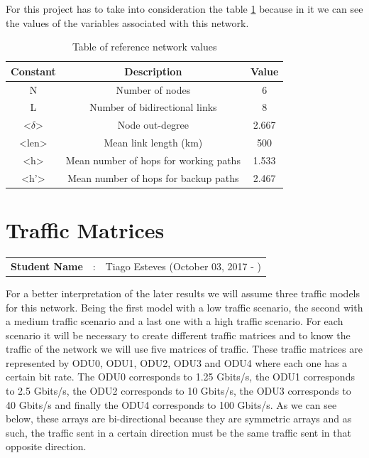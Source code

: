 \newpage
For this project has to take into consideration the table \ref{table_ref_net} because in it we can see the values of the variables associated with this network.\\

\begin{table}[h!]
\centering
\begin{tabular}{|| c | c | c||}
 \hline
 Constant & Description & Value \\
 \hline\hline
 N & Number of nodes & 6 \\
 L & Number of bidirectional links & 8 \\
 <$\delta$> & Node out-degree & 2.667 \\
 <len> & Mean link length (km) & 500 \\
 <h> & Mean number of hops for working paths & 1.533 \\
 <h'> & Mean number of hops for backup paths & 2.467 \\
 \hline
\end{tabular}
\caption{Table of reference network values}
\label{table_ref_net}
\end{table}


\section{Traffic Matrices}\label{Reference_Network_Traffic}
\begin{tcolorbox}	
\begin{tabular}{p{2.75cm} p{0.2cm} p{10.5cm}} 	
\textbf{Student Name}  &:& Tiago Esteves    (October 03, 2017 - )\\
\end{tabular}
\end{tcolorbox}
\vspace{11pt}

For a better interpretation of the later results we will assume three traffic models for this network.
Being the first model with a low traffic scenario, the second with a medium traffic scenario and a last one with a high traffic scenario.
For each scenario it will be necessary to create different traffic matrices and to know the traffic of the network we will use five matrices of traffic.
These traffic matrices are represented by ODU0, ODU1, ODU2, ODU3 and ODU4 where each one has a certain bit rate.
The ODU0 corresponds to 1.25 Gbits/s, the ODU1 corresponds to 2.5 Gbits/s, the ODU2 corresponds to 10 Gbits/s, the ODU3 corresponds to 40 Gbits/s and finally the ODU4 corresponds to 100 Gbits/s.
As we can see below, these arrays are bi-directional because they are symmetric arrays and as such, the traffic sent in a certain direction must be the same traffic sent in that opposite direction.

